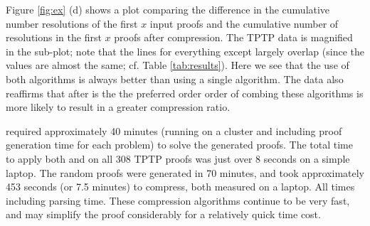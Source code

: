 {Figure \ref{fig:ex} (d) shows a plot comparing the difference in the cumulative number resolutions of the first $x$ input proofs and the cumulative number of resolutions in the first $x$ proofs after compression. The TPTP data is magnified in the sub-plot; note that the lines for everything except {\FORPI} largely overlap (since the values are almost the same; cf. Table \ref{tab:results}). Here we see that the use of both algorithms is always better than using a single algorithm. The data also reaffirms that {\FORPI} after {\GFOLU} is the the preferred order order of combing these algorithms is more likely to result in a greater compression ratio. 



{\SPASS} required approximately 40 minutes (running on a cluster and including proof generation time for each problem) to solve the generated proofs. The total time to apply both {\FORPI} and {\GFOLU} on all 308 TPTP proofs was just over 8 seconds on a simple laptop. The random proofs were generated in 70 minutes, and took approximately 453 seconds (or 7.5 minutes) to compress, both measured on a laptop.
All times including parsing time. These compression algorithms continue to be very fast, and may simplify the proof considerably for a relatively quick time cost.







}
